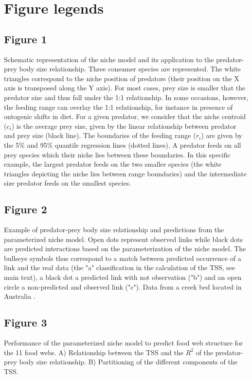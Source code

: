 \documentclass[12pt]{article}
\begin{document}
\printbibliography
\newpage

\section*{Figure legends}

\subsection*{Figure 1} 
Schematic representation of the niche model and its
application to the predator-prey body size relationship. Three consumer species
are represented. The white triangles correspond to the niche position of
predators (their position on the X axis is transposed along the Y axis). For
most cases, prey size is smaller that the predator size and thus fall under the
1:1 relationship. In some occasions, however, the feeding range can overlay the
1:1 relationship, for instance in presence of ontogenic shifts in diet. For a
given predator, we consider that the niche centroid ($c_i$) is the average prey
size, given by the linear relationship between predator and prey size (black
line). The boundaries of the feeding range ($r_i$) are given by the 5\% and 95\%
quantile regression lines (dotted lines). A predator feeds on all prey species
which their niche lies between these boundaries. In this specific example, the
largest predator feeds on the two smaller species (the white triangles depicting
the niche lies between range boundaries) and the intermediate size predator
feeds on the smallest species.

\subsection*{Figure 2} 
Example of predator-prey body size relationship and
predictions from the parameterized niche model. Open dots represent observed
links while black dots are predicted interactions based on the parameterization
of the niche model. The bullseye symbols thus correspond to a match between
predicted occurrence of a link and the real data (the "a" classification in the
calculation of the TSS, see main text), a black dot a predicted link with not
observation ("b") and an open circle a non-predicted and observed link ("c").
Data from a creek bed located in Australia \parencite{Brose2005}.

\subsection*{Figure 3} 
Performance of the parameterized niche model to predict
food web structure for the 11 food webs. A) Relationship between the TSS and the
$R^2$ of the predator-prey body size relationship. B) Partitioning of the
different components of the TSS.
\end{document}
